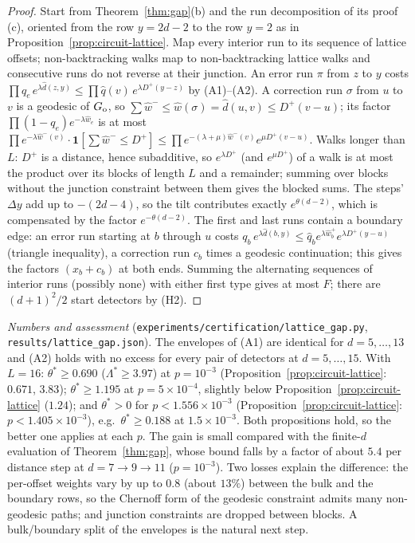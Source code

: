 \begin{proof}
Start from Theorem~\ref{thm:gap}(b) and the run decomposition of its proof (c), oriented from the row $y=2d-2$ to the row $y=2$ as in Proposition~\ref{prop:circuit-lattice}. Map every interior run to its sequence of lattice offsets; non-backtracking walks map to non-backtracking lattice walks and consecutive runs do not reverse at their junction.
An error run $\pi$ from $z$ to $y$ costs $\prod q_e\,e^{\lambda\hat d(z,y)}\le\prod\hat q(v)\,e^{\lambda D^+(y-z)}$ by (A1)--(A2).
A correction run $\sigma$ from $u$ to $v$ is a geodesic of $G_{\rm o}$, so $\sum\hat w^-\le\hat w(\sigma)=\hat d(u,v)\le D^+(v-u)$; its factor $\prod(1-q_e)e^{-\lambda\hat w_e}$ is at most $\prod e^{-\lambda\hat w^-(v)}\cdot\mathbf 1[\sum\hat w^-\le D^+]\le\prod e^{-(\lambda+\mu)\hat w^-(v)}e^{\mu D^+(v-u)}$.
Walks longer than $L$: $D^+$ is a distance, hence subadditive, so $e^{\lambda D^+}$ (and $e^{\mu D^+}$) of a walk is at most the product over its blocks of length $L$ and a remainder; summing over blocks without the junction constraint between them gives the blocked sums. The steps' $\Delta y$ add up to $-(2d-4)$, so the tilt contributes exactly $e^{\theta(d-2)}$, which is compensated by the factor $e^{-\theta(d-2)}$.
The first and last runs contain a boundary edge: an error run starting at $b$ through $u$ costs $q_b\,e^{\lambda\hat d(b,y)}\le\hat q_be^{\lambda\hat w_b^+}e^{\lambda D^+(y-u)}$ (triangle inequality), a correction run $c_b$ times a geodesic continuation; this gives the factors $(x_b+c_b)$ at both ends. Summing the alternating sequences of interior runs (possibly none) with either first type gives at most $F$; there are $(d+1)^2/2$ start detectors by (H2).
\end{proof}

\noindent\emph{Numbers and assessment} (\texttt{experiments/certification/lattice\_gap.py}, \texttt{results/lattice\_gap.json}). The envelopes of (A1) are identical for $d=5,\dots,13$ and (A2) holds with no excess for every pair of detectors at $d=5,\dots,15$. With $L=16$: $\theta^\ast\ge0.690$ ($\Lambda^\ast\ge3.97$) at $p=10^{-3}$ (Proposition~\ref{prop:circuit-lattice}: $0.671$, $3.83$); $\theta^\ast\ge1.195$ at $p=5\times10^{-4}$, slightly below Proposition~\ref{prop:circuit-lattice} ($1.24$); and $\theta^\ast>0$ for $p<1.556\times10^{-3}$ (Proposition~\ref{prop:circuit-lattice}: $p<1.405\times10^{-3}$), e.g.\ $\theta^\ast\ge0.188$ at $1.5\times10^{-3}$. Both propositions hold, so the better one applies at each $p$. The gain is small compared with the finite-$d$ evaluation of Theorem~\ref{thm:gap}, whose bound falls by a factor of about $5.4$ per distance step at $d=7\to9\to11$ ($p=10^{-3}$). Two losses explain the difference: the per-offset weights vary by up to $0.8$ (about $13\%$) between the bulk and the boundary rows, so the Chernoff form of the geodesic constraint admits many non-geodesic paths; and junction constraints are dropped between blocks. A bulk/boundary split of the envelopes is the natural next step.
